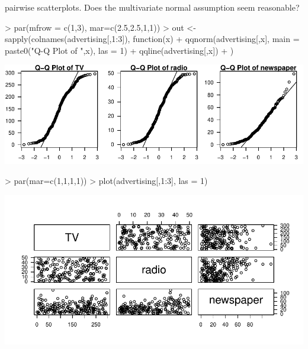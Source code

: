 \documentclass[12pt,a4paper]{paper}
\begin{document}
\begin{enumerate}
\begin{enumerate}
pairwise scatterplots. Does the multivariate normal assumption seem reasonable?
\begin{Schunk}
\begin{Sinput}
> par(mfrow = c(1,3), mar=c(2.5,2.5,1,1))
> out <- sapply(colnames(advertising[,1:3]), function(x){
+   qqnorm(advertising[,x], main = paste0("Q-Q Plot of ",x), las = 1)
+   qqline(advertising[,x])
+ })
\end{Sinput}
\end{Schunk}
\includegraphics{STAT636_Template-007}
\begin{Schunk}
\begin{Sinput}
> par(mar=c(1,1,1,1))
> plot(advertising[,1:3], las = 1)
\end{Sinput}
\end{Schunk}
\includegraphics{STAT636_Template-008}


\end{enumerate}
\end{enumerate}
\end{document}
